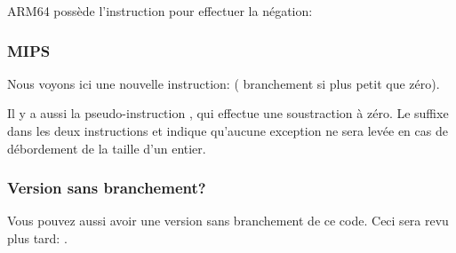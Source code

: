 ARM64 possède l'instruction  pour effectuer la négation:



\subsubsection{MIPS}



Nous voyons ici une nouvelle instruction:  (
branchement si plus petit que zéro).

Il y a aussi la pseudo-instruction , qui effectue une soustraction à zéro.
Le suffixe  dans les deux instructions  et  indique qu'aucune
exception ne sera levée en cas de débordement de la taille d'un entier.

\subsubsection{Version sans branchement?}

Vous pouvez aussi avoir une version sans branchement de ce code. Ceci sera revu plus
tard: .

